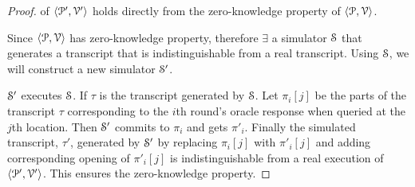 \begin{proof}
%	
	
	 of $\langle \mathcal{P}', \mathcal{V}' \rangle$ holds directly from the zero-knowledge property of $\langle \mathcal{P}, \mathcal{V} \rangle$. 
	
	Since $\langle \mathcal{P}, \mathcal{V} \rangle$ has zero-knowledge property, therefore $\exists$ a simulator $\mathcal{S}$ that generates a transcript that is indistinguishable from a real transcript. 
	Using $\mathcal{S}$, we will construct a new simulator $\mathcal{S}'$. 
	
	$\mathcal{S}'$ executes $\mathcal{S}$. If $\tau$ is the transcript generated by $\mathcal{S}$. Let $\pi_i[j]$ be the parts of the transcript $\tau$ corresponding to the $i$th round's oracle response when queried at the $j$th location. Then $\mathcal{S}'$ commits to $\pi_i$ and gets $\pi'_i$. Finally the simulated transcript, $\tau'$, generated by $\mathcal{S}'$ by replacing $\pi_i[j]$ with $\pi'_i[j]$ and adding corresponding opening of $\pi'_i[j]$ is indistinguishable from a real execution of $\langle \mathcal{P}', \mathcal{V}' \rangle$. This ensures the zero-knowledge property.
\end{proof}

